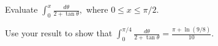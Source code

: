 Evaluate $\displaystyle{\int_{0}^{x} \frac{d\theta}{2 + \tan \theta}},$ where
$0 \le x \le \pi/2$.

Use your result to show that $\displaystyle{\int_{0}^{\pi/4} \frac{d\theta}{2 +
\tan \theta} = \frac{\pi + \ln(9/8)}{10}}$.
